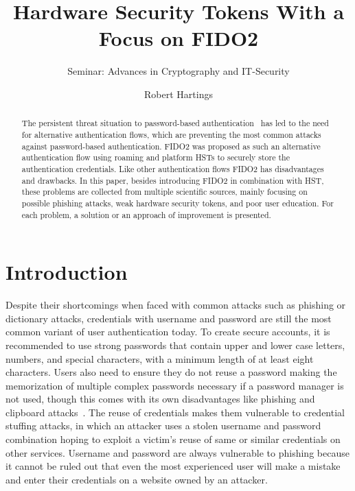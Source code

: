 \documentclass[runningheads]{llncs}
\begin{document}
%
\title{Hardware Security Tokens With a Focus on FIDO2}
\subtitle{Seminar: Advances in Cryptography and IT-Security}
%
%

\author{Robert Hartings}

%
\maketitle              %
\begin{abstract}
The persistent threat situation to password-based authentication~\cite{000006} has led to the need for alternative authentication flows, which are preventing the most common attacks against password-based authentication. FIDO2 was proposed as such an alternative authentication flow using roaming and platform HSTs to securely store the authentication credentials. Like other authentication flows FIDO2 has disadvantages and drawbacks. In this paper, besides introducing FIDO2 in combination with HST, these problems are collected from multiple scientific sources, mainly focusing on possible phishing attacks, weak hardware security tokens, and poor user education. For each problem, a solution or an approach of improvement is presented.

\end{abstract}
%
%
%
\section{Introduction}
Despite their shortcomings when faced with common attacks such as phishing or dictionary attacks, credentials with username and password are still the most common variant of user authentication today. To create secure accounts, it is recommended to use strong passwords that contain upper and lower case letters, numbers, and special characters, with a minimum length of at least eight characters. Users also need to ensure they do not reuse a password making the memorization of multiple complex passwords necessary if a password manager is not used, though this comes with its own disadvantages like phishing and clipboard attacks~\cite{8326801}. The reuse of credentials makes them vulnerable to credential stuffing attacks, in which an attacker uses a stolen username and password combination hoping to exploit a victim's reuse of same or similar credentials on other services. Username and password are always vulnerable to phishing because it cannot be ruled out that even the most experienced user will make a mistake and enter their credentials on a website owned by an attacker.
\end{document}
